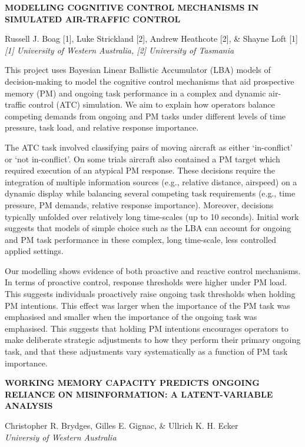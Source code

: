 \documentclass[]{article}
\begin{document}
\textbf{MODELLING COGNITIVE CONTROL MECHANISMS IN SIMULATED AIR-TRAFFIC
CONTROL}

Russell J. Boag {[}1{]}, Luke Strickland {[}2{]}, Andrew Heathcote
{[}2{]}, \& Shayne Loft {[}1{]}\\
\emph{{[}1{]} University of Western Australia, {[}2{]} University of
Tasmania}

This project uses Bayesian Linear Ballistic Accumulator (LBA) models of
decision-making to model the cognitive control mechanisms that aid
prospective memory (PM) and ongoing task performance in a complex and
dynamic air-traffic control (ATC) simulation. We aim to explain how
operators balance competing demands from ongoing and PM tasks under
different levels of time pressure, task load, and relative response
importance.

The ATC task involved classifying pairs of moving aircraft as either
`in-conflict' or `not in-conflict'. On some trials aircraft also
contained a PM target which required execution of an atypical PM
response. These decisions require the integration of multiple
information sources (e.g., relative distance, airspeed) on a dynamic
display while balancing several competing task requirements (e.g., time
pressure, PM demands, relative response importance). Moreover, decisions
typically unfolded over relatively long time-scales (up to 10 seconds).
Initial work suggests that models of simple choice such as the LBA can
account for ongoing and PM task performance in these complex, long
time-scale, less controlled applied settings.

Our modelling shows evidence of both proactive and reactive control
mechanisms. In terms of proactive control, response thresholds were
higher under PM load. This suggests individuals proactively raise
ongoing task thresholds when holding PM intentions. This effect was
larger when the importance of the PM task was emphasised and smaller
when the importance of the ongoing task was emphasised. This suggests
that holding PM intentions encourages operators to make deliberate
strategic adjustments to how they perform their primary ongoing task,
and that these adjustments vary systematically as a function of PM task
importance.\\
\pagebreak  

\textbf{WORKING MEMORY CAPACITY PREDICTS ONGOING RELIANCE ON
MISINFORMATION: A LATENT-VARIABLE ANALYSIS}

Christopher R. Brydges, Gilles E. Gignac, \& Ullrich K. H. Ecker\\
\emph{Universiy of Western Australia}
\end{document}
